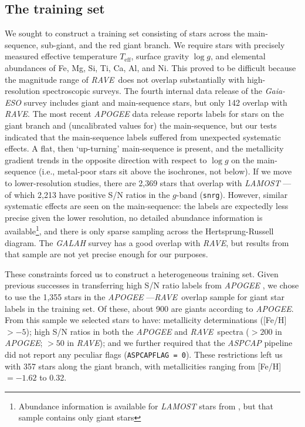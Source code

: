 \documentclass[preprint,trackchanges]{aastex}
\newcommand{\project}[1]{\textsl{#1}}
\newcommand{\acronym}[1]{{\small{#1}}}
\newcommand{\rave}{\project{\acronym{RAVE}}}
\newcommand{\logg}{\log g}
\newcommand{\teff}{T_{\mathrm{eff}}}
\begin{document}
\subsection{The training set}
\label{sec:the-training-set}

We sought to construct a training set consisting of stars across the main-sequence,
sub-giant, and the red giant branch.  We require stars with precisely measured
effective temperature $\teff$, surface gravity $\logg$, and elemental abundances
of Fe, Mg, Si, Ti, Ca, Al, and Ni.  This proved to be difficult because the magnitude
range of \rave\ does not overlap substantially with high-resolution spectroscopic
surveys.  The fourth internal data release of the \project{Gaia-ESO} survey includes 
giant and main-sequence stars, but only 142 overlap with \rave.  The most recent 
\project{APOGEE} data release \citep{sloan_dr13} reports labels for stars on the
giant branch and (uncalibrated values for) the main-sequence, but our tests indicated
that the main-sequence labels suffered from unexpected systematic effects.  A flat, 
then `up-turning' main-sequence is present, and the metallicity gradient trends in 
the opposite direction with respect to $\logg$ on the main-sequence (i.e., metal-poor
stars sit above the isochrones, not below).  If we move to lower-resolution studies,
there are 2,369 stars that overlap with \project{LAMOST} --- of which 2,213 have positive
S/N ratios in the $g$-band (\texttt{snrg}).  However, similar systematic effects are 
seen on the main-sequence: the labels are expectedly less precise given the lower
resolution, no detailed abundance information is available\footnote{Abundance 
information is available for \project{LAMOST} stars from \citet{Ho_2016}, but that 
sample contains only giant stars}, and there is only sparse sampling across the 
Hertsprung-Russell diagram.  The \project{GALAH} survey has a good overlap with \rave,
but results from that sample are not yet precise enough for our purposes.


These constraints forced us to construct a heterogeneous training set.  Given previous
successes in transferring high S/N ratio labels from \project{APOGEE} \citep{Ness_2015,
Ness_2016,Ho_2016,Casey_2016b}, we chose to use the 1,355 stars in the \project{APOGEE}
---\rave\ overlap sample for giant star labels in the training set.  Of these, about
900 are giants according to \project{APOGEE}.  From this sample we selected stars to
have: metallicity determinations ([Fe/H] $> -5$); high S/N ratios in both the 
\project{APOGEE} and \rave\ spectra ($>200$ in \project{APOGEE}; $>50$ in \rave); and
we further required that the \project{ASPCAP} pipeline did not report any peculiar
flags (\texttt{ASPCAPFLAG = 0}).  These restrictions left us with 357 stars along the
giant branch, with metallicities ranging from [Fe/H] $= -1.62$ to 0.32.
\end{document}
